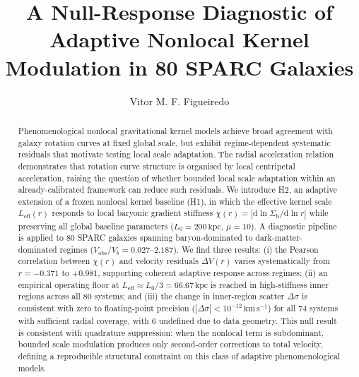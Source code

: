 \documentclass[twocolumn,linenumbers]{aastex701}
\newcommand{\Leff}{L_{\mathrm{eff}}}
\newcommand{\Lzero}{L_0}
\newcommand{\Vobs}{V_{\mathrm{obs}}}
\begin{document}
\title{A Null-Response Diagnostic of Adaptive Nonlocal Kernel Modulation in 80 SPARC Galaxies}


\author[orcid=0009-0004-7358-4622]{Vitor M. F. Figueiredo}

\begin{abstract}
Phenomenological nonlocal gravitational kernel models achieve broad agreement
with galaxy rotation curves at fixed global scale, but exhibit
regime-dependent systematic residuals that motivate testing local scale
adaptation. The radial acceleration relation \citep{mcgaugh2016, lelli2017}
demonstrates that rotation curve structure is organised by local centripetal
acceleration, raising the question of whether bounded local scale adaptation within an
already-calibrated framework can reduce such residuals. We introduce H2, an
adaptive extension of a frozen nonlocal kernel baseline (H1), in which the
effective kernel scale $\Leff(r)$ responds to local baryonic gradient stiffness
$\chi(r) = |\mathrm{d}\ln \Sigma_\mathrm{b}/\mathrm{d}\ln r|$ while
preserving all global baseline parameters ($\Lzero = 200\,\mathrm{kpc}$,
$\mu = 10$). A diagnostic pipeline is applied to 80 SPARC galaxies
\citep{lelli2016} spanning baryon-dominated to dark-matter-dominated regimes
($\Vobs/V_b = 0.027$--$2.187$). We find three results: (i) the Pearson
correlation between $\chi(r)$ and velocity residuals $\Delta V(r)$ varies
systematically from $r = -0.371$ to $+0.981$, supporting coherent adaptive
response across regimes; (ii) an empirical operating floor at $\Leff \approx
\Lzero/3 = 66.67\,\mathrm{kpc}$ is reached in high-stiffness inner regions
across all 80 systems; and (iii) the change in inner-region scatter
$\Delta\sigma$ is consistent with zero to floating-point precision
($|\Delta\sigma| < 10^{-12}\,\mathrm{km\,s^{-1}}$) for all 74 systems with
sufficient radial coverage, with 6 undefined due to data geometry. This null
result is consistent with quadrature suppression: when the nonlocal term is
subdominant, bounded scale modulation produces only second-order corrections
to total velocity, defining a reproducible structural constraint on this class
of adaptive phenomenological models.
\end{abstract}
\end{document}

